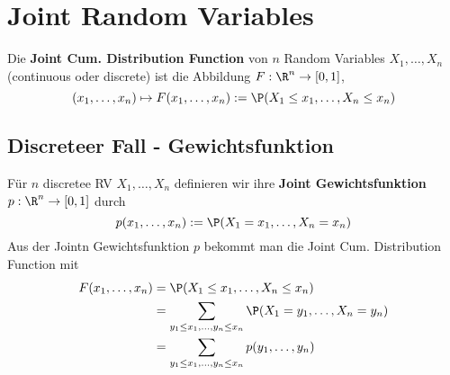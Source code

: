 \section{Joint Random Variables}
\begin{mainbox}{}
    Die \textbf{Joint Cum. Distribution Function} von $n$ Random Variables $X_1, \ldots, X_n$ (continuous oder discrete) ist die Abbildung $F: \R^n \to [0,1]$,
    $$(x_1, \ldots, x_n) \mapsto F(x_1, \ldots, x_n) := \P(X_1 \leq x_1, \ldots, X_n \leq x_n)$$
\end{mainbox}
\subsection{Discreteer Fall - Gewichtsfunktion}
    Für $n$ discretee RV $X_1, \ldots, X_n$ definieren wir ihre \textbf{Joint Gewichtsfunktion} $p: \R^n \to [0,1]$ durch
    $$p(x_1, \ldots, x_n) := \P(X_1 = x_1, \ldots, X_n = x_n)$$
    Aus der Jointn Gewichtsfunktion $p$ bekommt man die Joint Cum. Distribution Function mit
    \begin{align*}
        F(x_1, \ldots, x_n) &= \P(X_1 \leq x_1, \ldots, X_n \leq x_n)\\
        &= \sum_{y_1 \leq x_1, \ldots, y_n \leq x_n}\P(X_1 = y_1, \ldots, X_n = y_n)\\
        &= \sum_{y_1 \leq x_1, \ldots, y_n \leq x_n}p(y_1, \ldots,y_n)
    \end{align*}    

